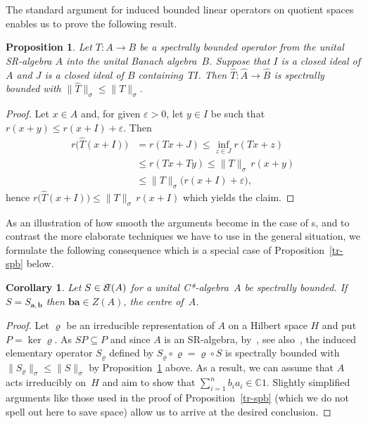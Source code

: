 \documentclass[a4paper,12pt,reqno]{amsart}
\numberwithin{equation}{section}
\newtheorem{cor}[thm]{Corollary}
\newtheorem{prop}[thm]{Proposition}
\theoremstyle{definition}
\begin{document}
The standard argument for induced bounded linear operators on quotient spaces enables us to prove the following result.
\begin{prop}\label{prop:sr-quotients}
Let $T\colon A\to B$ be a spectrally bounded operator from the unital SR-algebra $A$ into the unital Banach algebra~$B$.
Suppose that $I$ is a closed ideal of $A$ and $J$ is a closed ideal of $B$ containing~$TI$. Then $\hat T\colon\hat A\to\hat B$
is spectrally bounded with ${{\|{{\hat T}}\|_\sigma}}\leq{{\|{T}\|_\sigma}}$.
\end{prop}
\begin{proof}
Let $x\in A$ and, for given $\varepsilon>0$, let $y\in I$ be such that $r(x+y)\leq r(x+I)+\varepsilon$. Then
\begin{equation*}
\begin{split}
r\bigl(\hat T(x+I)\bigr) &=r(Tx+J)\leq\inf_{z\in J}r(Tx+z)\\
                                              &\leq r(Tx+Ty)\leq{{\|{T}\|_\sigma}}\,r(x+y)\\
                                              &\leq{{\|{T}\|_\sigma}}\bigl(r(x+I)+\varepsilon\bigr),
\end{split}
\end{equation*}
hence $r\bigl(\hat T(x+I)\bigr)\leq{{\|{T}\|_\sigma}}\,r(x+I)$ which yields the claim.
\end{proof}
As an illustration of how smooth the arguments become in the case of \C*s, and to contrast the more elaborate
techniques we have to use in the general situation, we formulate the following consequence which is a special
case of Proposition~\ref{tr-spb} below.
\begin{cor}\label{cor:cstar-quotients}
Let $S\in{{\mathcal{E}\kern-2.6pt\ell(A)}}$ for a unital {{\sl C*}-algebra}~$A$ be spectrally bounded. If $S=S_{\bm a,\bm b}$ then $\bm{ba}\in Z(A)$,
the centre of~$A$.
\end{cor}
\begin{proof}
Let $\varrho$ be an irreducible representation of $A$ on a Hilbert space $H$ and put $P=\ker\varrho$.
As $SP\subseteq P$ and since $A$ is an SR-algebra, by~\cite{Ped76}, see also~\cite{MW79},
the induced elementary operator $S_\varrho$ defined by $S_\varrho\circ\varrho=\varrho\circ S$ is
spectrally bounded with ${{\|{{S_\varrho}}\|_\sigma}}\leq{{\|{S}\|_\sigma}}$ by Proposition~\ref{prop:sr-quotients} above.
As a result, we can assume that $A$ acts irreducibly on~$H$ and aim to show that $\sum_{i=1}^n b_ia_i\in{\mathbb{C}}1$.
Slightly simplified arguments like those used in the proof of Proposition~\ref{tr-spb} (which we do not spell out here
to save space) allow us to arrive at the desired conclusion.
\end{proof}
\end{document}
